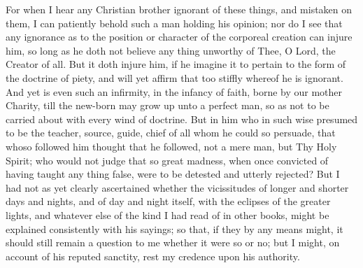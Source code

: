 \documentclass[b5paper,openright,12pt,twoside]{book}
\begin{document}
For when I hear any Christian brother ignorant of these things, and
mistaken on them, I can patiently behold such a man holding his opinion;
nor do I see that any ignorance as to the position or character of the
corporeal creation can injure him, so long as he doth not believe any
thing unworthy of Thee, O Lord, the Creator of all. But it doth injure
him, if he imagine it to pertain to the form of the doctrine of piety,
and will yet affirm that too stiffly whereof he is ignorant. And yet
is even such an infirmity, in the infancy of faith, borne by our mother
Charity, till the new-born may grow up unto a perfect man, so as not
to be carried about with every wind of doctrine. But in him who in such
wise presumed to be the teacher, source, guide, chief of all whom he
could so persuade, that whoso followed him thought that he followed,
not a mere man, but Thy Holy Spirit; who would not judge that so great
madness, when once convicted of having taught any thing false, were
to be detested and utterly rejected? But I had not as yet clearly
ascertained whether the vicissitudes of longer and shorter days and
nights, and of day and night itself, with the eclipses of the greater
lights, and whatever else of the kind I had read of in other books,
might be explained consistently with his sayings; so that, if they by
any means might, it should still remain a question to me whether it
were so or no; but I might, on account of his reputed sanctity, rest my
credence upon his authority.
\end{document}

